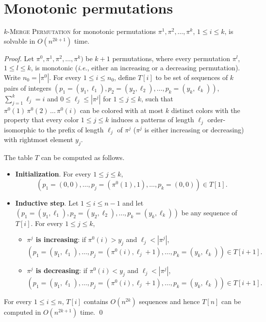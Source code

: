 \section{Monotonic permutations}
\label{section:Monotonic permutations}

\begin{proposition}
  \label{proposition:Monotonic Permutation Coloring}
  \textsc{$k$-Merge Permutation} for monotonic permutations
  $\pi^1, \pi^2, \dots, \pi^k$, $1 \leq i \leq k$, is
  solvable in $O(n^{2k+1})$ time.
\end{proposition}

\begin{proof}
  Let $\pi^0, \pi^1, \pi^2, \dots, \pi^k)$ be $k+1$ permutations, where every permutation
  $\pi^l$, $1 \leq l \leq k$, is
  monotonic (\emph{i.e.}, either an increasing or a decreasing permutation).
  Write $n_0 = |\pi^0|$.
  For every $1 \leq i \leq n_0$, define $T[i]$ to be set of sequences of $k$ pairs of integers
  $(p_1 = (y_1, \ell_1), p_2 = (y_2, \ell_2), \dots, p_k = (y_k, \ell_k))$,
  $\sum_{j=1}^{k} \ell_j = i$ and $0 \leq \ell_j \leq |\pi^j|$ for $1 \leq j \leq k$,
  such that
  $\pi^0(1) \, \pi^0(2) \, \dots \, \pi^0(i)$ can be colored with at most $k$
  distinct colors
  with the property that every color $1 \leq j \leq k$ induces a patterns of length $\ell_j$
  order-isomorphic to the prefix of length $\ell_j$ of $\pi^j$ ($\pi^j$ is either increasing or decreasing)
  with rightmost element $y_j$.

  The table $T$ can be computed as follows.
  \begin{itemize}
    \item \textbf{Initialization}.
    For every $1 \leq j \leq k$,
    $$(p_1=(0,0), \dots, p_j=(\pi^0(1), 1), \dots, p_k=(0,0)) \in T[1]\text{.}$$

    \item \textbf{Inductive step}.
    Let $1 \leq i \leq n-1$ and
    let $(p_1 = (y_1, \ell_1), p_2 = (y_2, \ell_2), \dots, p_k = (y_k, \ell_k))$ be any sequence of
    $T[i]$.
    For every $1 \leq j \leq k$,
    \begin{itemize}
      \item \textbf{$\pi^j$ is increasing}:
      if $\pi^0(i) > y_j$ and $\ell_j < |\pi^j|$,
      $$(p_1=(y_1, \ell_1), \dots, p_j=(\pi^0(i), \ell_j+1), \dots, p_k=(y_k, \ell_k)) \in T[i+1]\text{.}$$
      \item \textbf{$\pi^j$ is decreasing}:
      if $\pi^0(i) < y_j$ and $\ell_j < |\pi^j|$,
      $$(p_1=(y_1, \ell_1), \dots, p_j=(\pi^0(i), \ell_j+1), \dots, p_k=(y_k, \ell_k)) \in T[i+1]\text{.}$$
    \end{itemize}
  \end{itemize}

  For every $1 \leq i \leq n$, $T[i]$ contains $O(n^{2k})$ sequences and hence
  $T[n]$ can be computed in $O(n^{2k+1})$ time.
  \qed
\end{proof}

